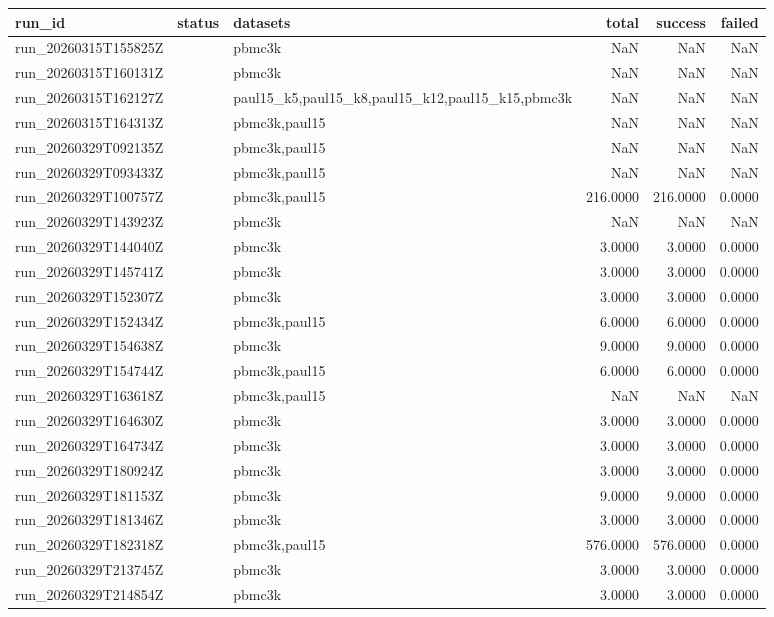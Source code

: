\begin{tabular}{lllrrr}
\toprule
run\_id & status & datasets & total & success & failed \\
\midrule
run\_20260315T155825Z &  & pbmc3k & NaN & NaN & NaN \\
run\_20260315T160131Z &  & pbmc3k & NaN & NaN & NaN \\
run\_20260315T162127Z &  & paul15\_k5,paul15\_k8,paul15\_k12,paul15\_k15,pbmc3k & NaN & NaN & NaN \\
run\_20260315T164313Z &  & pbmc3k,paul15 & NaN & NaN & NaN \\
run\_20260329T092135Z &  & pbmc3k,paul15 & NaN & NaN & NaN \\
run\_20260329T093433Z &  & pbmc3k,paul15 & NaN & NaN & NaN \\
run\_20260329T100757Z &  & pbmc3k,paul15 & 216.0000 & 216.0000 & 0.0000 \\
run\_20260329T143923Z &  & pbmc3k & NaN & NaN & NaN \\
run\_20260329T144040Z &  & pbmc3k & 3.0000 & 3.0000 & 0.0000 \\
run\_20260329T145741Z &  & pbmc3k & 3.0000 & 3.0000 & 0.0000 \\
run\_20260329T152307Z &  & pbmc3k & 3.0000 & 3.0000 & 0.0000 \\
run\_20260329T152434Z &  & pbmc3k,paul15 & 6.0000 & 6.0000 & 0.0000 \\
run\_20260329T154638Z &  & pbmc3k & 9.0000 & 9.0000 & 0.0000 \\
run\_20260329T154744Z &  & pbmc3k,paul15 & 6.0000 & 6.0000 & 0.0000 \\
run\_20260329T163618Z &  & pbmc3k,paul15 & NaN & NaN & NaN \\
run\_20260329T164630Z &  & pbmc3k & 3.0000 & 3.0000 & 0.0000 \\
run\_20260329T164734Z &  & pbmc3k & 3.0000 & 3.0000 & 0.0000 \\
run\_20260329T180924Z &  & pbmc3k & 3.0000 & 3.0000 & 0.0000 \\
run\_20260329T181153Z &  & pbmc3k & 9.0000 & 9.0000 & 0.0000 \\
run\_20260329T181346Z &  & pbmc3k & 3.0000 & 3.0000 & 0.0000 \\
run\_20260329T182318Z &  & pbmc3k,paul15 & 576.0000 & 576.0000 & 0.0000 \\
run\_20260329T213745Z &  & pbmc3k & 3.0000 & 3.0000 & 0.0000 \\
run\_20260329T214854Z &  & pbmc3k & 3.0000 & 3.0000 & 0.0000 \\

\end{tabular}
